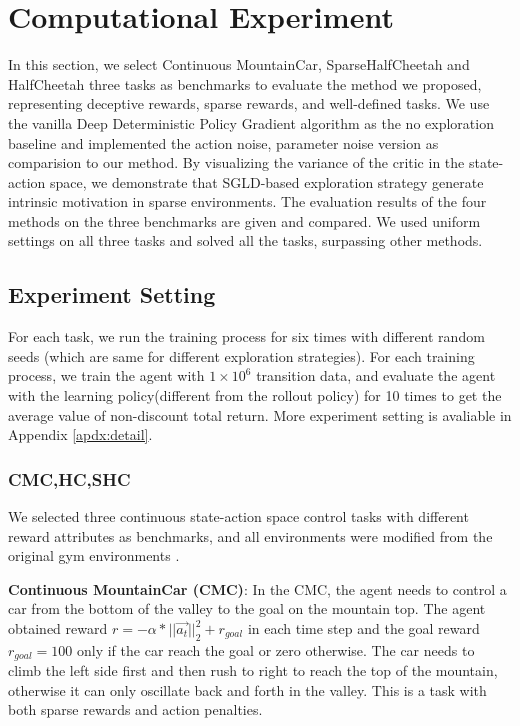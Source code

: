 \section{Computational Experiment}
In this section, we select Continuous MountainCar, SparseHalfCheetah and HalfCheetah three tasks as benchmarks to evaluate the method we proposed, representing deceptive rewards, sparse rewards, and well-defined tasks. We use the vanilla Deep Deterministic Policy Gradient algorithm as the no exploration baseline and implemented the action noise, parameter noise version as comparision to our method. By visualizing the variance of the critic in the state-action space, we demonstrate that SGLD-based exploration strategy generate intrinsic motivation in sparse environments. The evaluation results of the four methods on the three benchmarks are given and compared. We used uniform settings on all three tasks and solved all the tasks, surpassing other methods.

\subsection{Experiment Setting}
For each task, we run the training process for six times with different random seeds (which are same for different exploration strategies). For each training process, we train the agent with $1\times10^6$ transition data, and evaluate the agent with the learning policy(different from the rollout policy) for 10 times to get the average value of non-discount total return. More experiment setting is avaliable in Appendix \ref{apdx:detail}.

\subsubsection{CMC,HC,SHC}
We selected three continuous state-action space control tasks with different reward attributes as benchmarks, and all environments were modified from the original gym environments \cite{gym}.

\textbf{Continuous MountainCar (CMC)}\cite{MC}: In the CMC, the agent needs to control a car from the bottom of the valley to the goal on the mountain top. The agent obtained reward $r = -\alpha*||\vec{a_t}||^2_2 + r_{goal}$ in each time step and the goal reward $r_{goal}=100$ only if the car reach the goal or zero otherwise. The car needs to climb the left side first and then rush to right to reach the top of the mountain, otherwise it can only oscillate back and forth in the valley. This is a task with both sparse rewards and action penalties.

